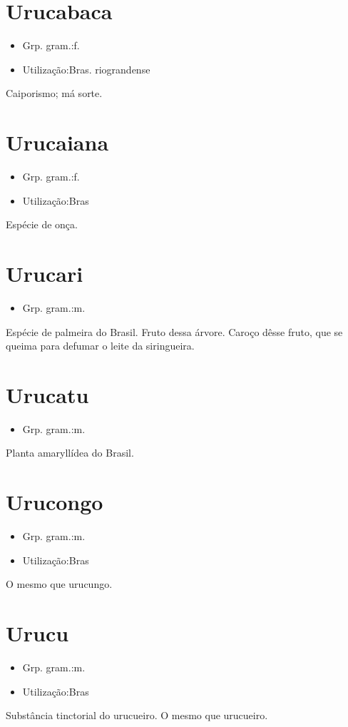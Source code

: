 \documentclass{article}
\begin{document}
\section{Urucabaca}
\begin{itemize}
\item {Grp. gram.:f.}
\end{itemize}
\begin{itemize}
\item {Utilização:Bras. riograndense}
\end{itemize}
Caiporismo; má sorte.
\section{Urucaiana}
\begin{itemize}
\item {Grp. gram.:f.}
\end{itemize}
\begin{itemize}
\item {Utilização:Bras}
\end{itemize}
Espécie de onça.
\section{Urucari}
\begin{itemize}
\item {Grp. gram.:m.}
\end{itemize}
Espécie de palmeira do Brasil.
Fruto dessa árvore.
Caroço dêsse fruto, que se queima para defumar o leite da siringueira.
\section{Urucatu}
\begin{itemize}
\item {Grp. gram.:m.}
\end{itemize}
Planta amaryllídea do Brasil.
\section{Urucongo}
\begin{itemize}
\item {Grp. gram.:m.}
\end{itemize}
\begin{itemize}
\item {Utilização:Bras}
\end{itemize}
O mesmo que \textunderscore urucungo\textunderscore .
\section{Urucu}
\begin{itemize}
\item {Grp. gram.:m.}
\end{itemize}
\begin{itemize}
\item {Utilização:Bras}
\end{itemize}
Substância tinctorial do urucueiro.
O mesmo que \textunderscore urucueiro\textunderscore .
\end{document}
